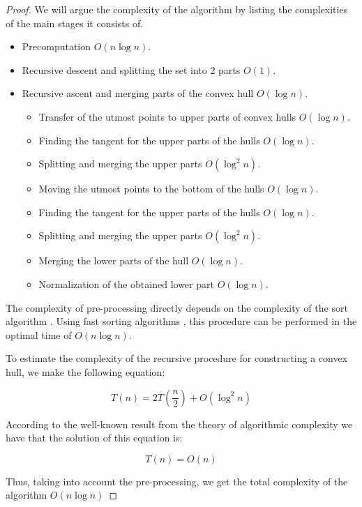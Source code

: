 \documentclass[conference]{IEEEtran}
\theoremstyle{plane}
\begin{document}
\begin{proof}
	We will argue the complexity of the algorithm by listing the complexities of the main stages it consists of.
	
	\begin{itemize}
		\item
		Precomputation $O(n\log n)$.
		\item
		Recursive descent and splitting the set into 2 parts $O(1)$.
		\item
		Recursive ascent and merging parts of the convex hull $O(\log n)$.
		\begin{itemize}
			\item
			Transfer of the utmost points to upper parts of convex hulls $O(\log n)$.
			\item
			Finding the tangent for the upper parts of the hulls $O(\log n)$.
			\item
			Splitting and merging the upper parts $O(\log^2 n)$.
			\item
			Moving the utmost points to the bottom of the hulls $O(\log n)$.
			\item
			Finding the tangent for the upper parts of the hulls $O(\log n)$.
			\item
			Splitting and merging the upper parts $O(\log^2 n)$.
			\item
			Merging the lower parts of the hull $O(\log n)$.
			\item
			Normalization of the obtained lower part $O(\log n)$.
		\end{itemize}
	\end{itemize}
	
	The complexity of pre-processing directly depends on the complexity of the sort algorithm . Using fast sorting algorithms \cite[page~159]{cormen}, this procedure can be performed in the optimal time of $O(n\log n)$.
	
	To estimate the complexity of the recursive procedure for constructing a convex hull, we make the following equation:
	
	\begin{equation*}
	T(n) = 2T(\frac{n}{2}) + O(\log^2 n)
	\end{equation*}
	
	According to the well-known result from the theory of algorithmic complexity we have that the solution of this equation is:
	
	\begin{equation*}
	T(n)=O(n)
	\end{equation*}
	
	Thus, taking into account the pre-processing, we get the total complexity of the algorithm $O(n\log n)$
\end{proof}
\end{document}
